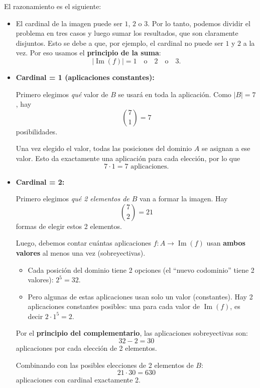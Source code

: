 \documentclass[a4paper,12pt]{article}
\begin{document}
\begin{ejercicio}[title=Ejercicio 20]

El razonamiento es el siguiente:

\begin{itemize}
    \item El cardinal de la imagen puede ser $1$, $2$ o $3$. Por lo tanto, podemos dividir el problema en tres casos y luego sumar los resultados, que son claramente disjuntos. Esto se debe a que, por ejemplo, el cardinal no puede ser $1$ y $2$ a la vez. Por eso usamos el \textbf{principio de la suma}:
    \[
    |\operatorname{Im}(f)| = 1 \quad\text{o}\quad 2 \quad\text{o}\quad 3.
    \]

    \item \textbf{Cardinal = 1 (aplicaciones constantes):}  

    Primero elegimos \emph{qué} valor de $B$ se usará en toda la aplicación. Como $|B|=7$, hay
    \[
    \binom{7}{1} = 7
    \]
    posibilidades.  

    Una vez elegido el valor, todas las posiciones del dominio $A$ se asignan a ese valor. Esto da exactamente una aplicación para cada elección, por lo que
    \[
    7 \cdot 1 = 7 \text{ aplicaciones.}
    \]

    \item \textbf{Cardinal = 2:}  

    Primero elegimos \emph{qué 2 elementos de $B$} van a formar la imagen. Hay
    \[
    \binom{7}{2} = 21
    \]
    formas de elegir estos 2 elementos.  

    Luego, debemos contar cuántas aplicaciones $f : A \to \operatorname{Im}(f)$ usan \textbf{ambos valores} al menos una vez (sobreyectivas).  

    \begin{itemize}
    \item Cada posición del dominio tiene 2 opciones (el “nuevo codominio” tiene 2 valores): $2^5 = 32$.  
    \item Pero algunas de estas aplicaciones usan solo un valor (constantes). Hay 2 aplicaciones constantes posibles: una para cada valor de $\operatorname{Im}(f)$, es decir $2 \cdot 1^5 = 2$.  
    \end{itemize}

    Por el \textbf{principio del complementario}, las aplicaciones sobreyectivas son:
    \[
    32 - 2 = 30
    \]
    aplicaciones por cada elección de 2 elementos.

    Combinando con las posibles elecciones de 2 elementos de $B$:
    \[
    21 \cdot 30 = 630
    \]
    aplicaciones con cardinal exactamente 2.

    \end{itemize}
    \end{ejercicio}
\end{document}
